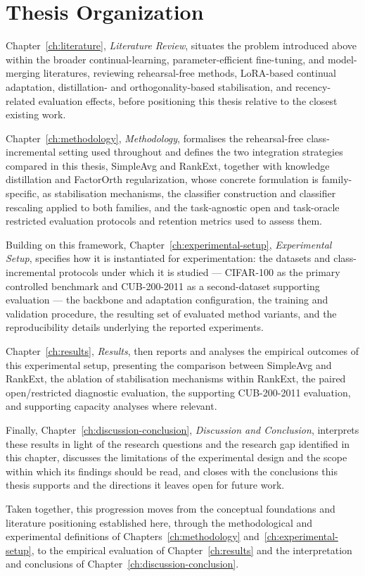 \section{Thesis Organization}
\label{sec:ch1-thesis-organization}

Chapter~\ref{ch:literature}, \emph{Literature Review}, situates the problem
introduced above within the broader continual-learning,
parameter-efficient fine-tuning, and model-merging literatures, reviewing
rehearsal-free methods, LoRA-based continual adaptation, distillation- and
orthogonality-based stabilisation, and recency-related evaluation effects,
before positioning this thesis relative to the closest existing work.

Chapter~\ref{ch:methodology}, \emph{Methodology}, formalises the
rehearsal-free class-incremental setting used throughout and defines the
two integration strategies compared in this thesis, SimpleAvg and RankExt,
together with knowledge distillation and FactorOrth regularization, whose
concrete formulation is family-specific, as stabilisation mechanisms, the classifier construction and classifier rescaling applied to both
families, and the task-agnostic open and task-oracle restricted evaluation
protocols and retention metrics used to assess them.

Building on this framework, Chapter~\ref{ch:experimental-setup},
\emph{Experimental Setup}, specifies how it is instantiated for
experimentation: the datasets and class-incremental protocols under which
it is studied --- CIFAR-100 as the primary controlled benchmark and
CUB-200-2011 as a second-dataset supporting evaluation --- the backbone and adaptation configuration, the
training and validation procedure, the resulting set of evaluated method
variants, and the reproducibility details underlying the reported
experiments.

Chapter~\ref{ch:results}, \emph{Results}, then reports and analyses the
empirical outcomes of this experimental setup, presenting the comparison
between SimpleAvg and RankExt, the ablation of stabilisation mechanisms
within RankExt, the paired open/restricted diagnostic evaluation, the
supporting CUB-200-2011 evaluation, and supporting capacity analyses where
relevant.

Finally, Chapter~\ref{ch:discussion-conclusion}, \emph{Discussion and
Conclusion}, interprets these results in light of the research questions
and the research gap identified in this chapter, discusses the limitations
of the experimental design and the scope within which its findings should
be read, and closes with the conclusions this thesis supports and the
directions it leaves open for future work.

Taken together, this progression moves from the conceptual foundations and
literature positioning established here, through the methodological and
experimental definitions of Chapters~\ref{ch:methodology}
and~\ref{ch:experimental-setup}, to the empirical evaluation of
Chapter~\ref{ch:results} and the interpretation and conclusions of
Chapter~\ref{ch:discussion-conclusion}.
